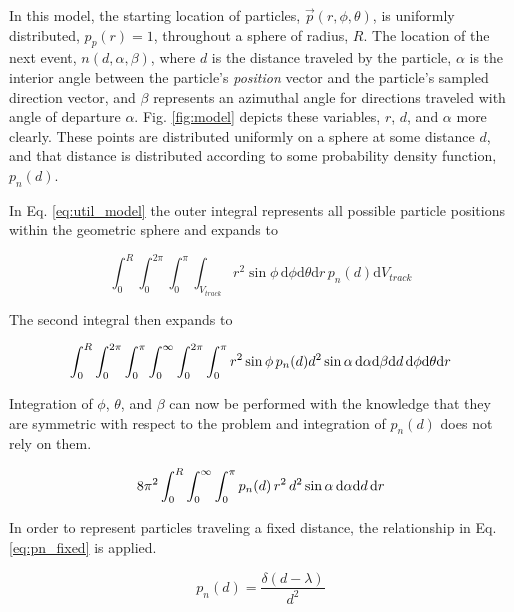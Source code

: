 In this model, the starting location of particles, $\vec{p}(r,\phi,\theta)$, is
uniformly distributed, $p_p(r)=1$, throughout a sphere of radius, $R$.  The
location of the next event, $n(d,\alpha,\beta)$, where $d$ is the distance
traveled by the particle, $\alpha$ is the interior angle between the
particle's \textit{position} vector and the particle's sampled direction
vector, and $\beta$ represents an azimuthal angle for directions traveled with
angle of departure $\alpha$. Fig. \ref{fig:model} depicts these
variables, $r$, $d$, and $\alpha$ more clearly.  These points are distributed
uniformly on a sphere at some distance $d$, and that distance is distributed
according to some probability density function, $p_n(d)$. 

In Eq. \ref{eq:util_model} the outer integral represents all possible particle positions within the
geometric sphere and expands to

\begin{equation}
\int_{0}^{R}\int_{0}^{2\pi}\int_{0}^{\pi}\int_{V_{track}} r^2\sin{\phi} \, \mathrm{d}\phi
\mathrm{d}\theta \mathrm{d}r \,  p_n(d) \mathrm{d}V_{track}
\end{equation}

The second integral then expands to

\begin{equation}
\small \int_{0}^{R}\int_{0}^{2\pi}\int_{0}^{\pi}\int_{0}^{\infty}\int_{0}^{2\pi}\int_{0}^{\pi}
r^2\sin{\phi} \, p_n(d) d^2 \sin{\alpha} \, \mathrm{d}\alpha \mathrm{d}\beta \mathrm{d}d \, \mathrm{d}\phi
\mathrm{d}\theta \mathrm{d}r
\end{equation}

Integration of $\phi$, $\theta$, and $\beta$ can now be performed with
the knowledge that they are symmetric with respect to the problem and
integration of $p_n(d)$ does not rely on them.

\begin{equation}
\small 8\pi^2  \int_{0}^{R}\int_{0}^{\infty}\int_{0}^{\pi} p_n(d) \,
r^2 \, d^2 \sin{\alpha} \, \mathrm{d}\alpha \mathrm{d}d \, \mathrm{d}r
\end{equation}

In order to represent particles traveling a fixed distance, the relationship in Eq. \ref{eq:pn_fixed}
is applied.

\begin{equation}
  \label{eq:pn_fixed}
  p_n(d) = \frac{\delta(d-\lambda)}{d^{2}}
\end{equation}

